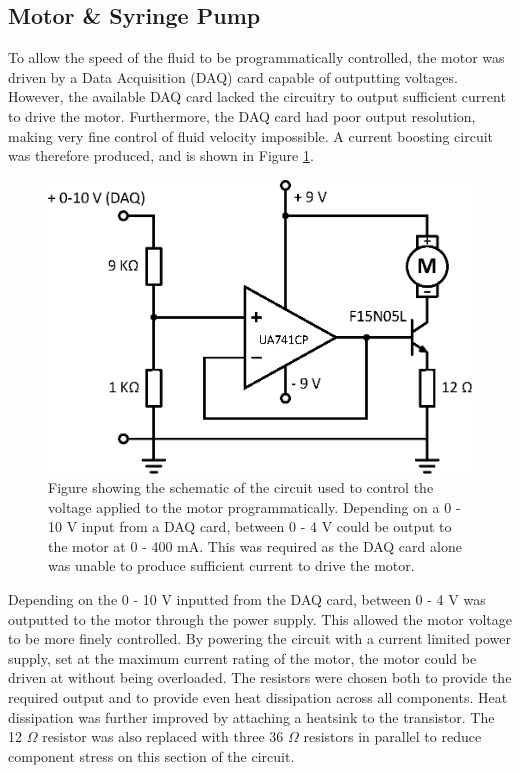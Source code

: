 \documentclass{physics_article_B}
\begin{document}
    \vspace*{-0.1cm}\subsection{Motor \& Syringe Pump\label{sect:method:motor}}

        To allow the speed of the fluid to be programmatically controlled, the motor was driven by a Data Acquisition (DAQ) card capable of outputting voltages. However, the available DAQ card lacked the circuitry to output sufficient current to drive the motor. Furthermore, the DAQ card had poor output resolution, making very fine control of fluid velocity impossible. A current boosting circuit was therefore produced, and is shown in Figure \ref{fig:MotorCircuit}.  
        
            \begin{figure}[H]
                \centering
                \hspace*{-1.3cm}\includegraphics[scale=0.77]{Figures/MotorCircuit.eps}
                \caption{Figure showing the schematic of the circuit used to control the voltage applied to the motor programmatically. Depending on a 0 - 10 V input from a DAQ card, between 0 - 4 V could be output to the motor at 0 - 400 mA. This was required as the DAQ card alone was unable to produce sufficient current to drive the motor.}
                \label{fig:MotorCircuit}
            \end{figure}
        \vspace*{-0.4cm}
        Depending on the 0 - 10 V inputted from the DAQ card, between 0 - 4 V was outputted to the motor through the power supply. This allowed the motor voltage to be more finely controlled. By powering the circuit with a current limited power supply, set at the maximum current rating of the motor, the motor could be driven at without being overloaded. The resistors were chosen both to provide the required output and to provide even heat dissipation across all components. Heat dissipation was further improved by attaching a heatsink to the transistor. The 12 $\Omega$ resistor was also replaced with three 36 $\Omega$ resistors\cite{artofelectronics} in parallel to reduce component stress on this section of the circuit. 
        
\end{document}
